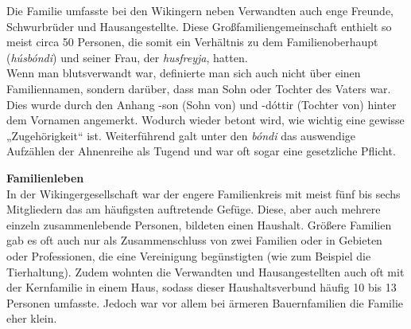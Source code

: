 \documentclass[12pt,a4paper,ngerman,openany]{book}
\begin{document}
Die Familie umfasste bei den Wikingern neben Verwandten auch enge Freunde,
Schwurbrüder und Hausangestellte. Diese Großfamiliengemeinschaft enthielt so meist circa 50 Personen, die somit ein Verhältnis zu dem Familienoberhaupt (\textit{húsbóndi}) und seiner Frau, der \textit{husfreyja}, hatten.\\
Wenn man blutsverwandt war, definierte man sich auch nicht über einen Familiennamen, sondern darüber, dass man Sohn oder Tochter des Vaters war. Dies wurde durch den Anhang -son (Sohn von) und -dóttir (Tochter von) hinter dem Vornamen angemerkt.
Wodurch wieder betont wird, wie wichtig eine gewisse „Zugehörigkeit“ ist. Weiterführend galt unter den \textit{bóndi} das auswendige Aufzählen der Ahnenreihe als Tugend und war oft sogar eine gesetzliche Pflicht.


\textbf{Familienleben}\\
In der Wikingergesellschaft war der engere Familienkreis mit meist fünf bis sechs Mitgliedern das am häufigsten auftretende Gefüge. Diese, aber auch mehrere einzeln zusammenlebende Personen, bildeten einen Haushalt. Größere Familien gab es oft auch nur als Zusammenschluss von zwei Familien oder in Gebieten oder Professionen, die eine Vereinigung begünstigten (wie zum Beispiel die Tierhaltung). Zudem wohnten die Verwandten und Hausangestellten auch oft mit der Kernfamilie in einem Haus, sodass dieser Haushaltsverbund häufig 10 bis 13 Personen umfasste. Jedoch war vor allem bei ärmeren Bauernfamilien die Familie eher klein.
\end{document}
